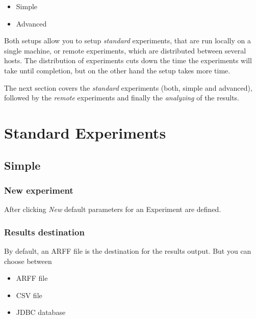 \documentclass[a4paper]{article}
\begin{document}
\begin{itemize}
	\item Simple
	\item Advanced 
\end{itemize}

Both setups allow you to setup \textit{standard} experiments, that are run locally on a single machine, or remote experiments, which are distributed between several hosts. The distribution of experiments cuts down the time the experiments will take until completion, but on the other hand the setup takes more time.

The next section covers the \textit{standard} experiments (both, simple and advanced), followed by the \textit{remote} experiments and finally the \textit{analyzing} of the results.


\newpage
\section{Standard Experiments}


\subsection{Simple}

\subsubsection{New experiment}

After clicking \textit{New} default parameters for an Experiment are defined.

\begin{center}
\end{center}


\subsubsection{Results destination}

By default, an ARFF file is the destination for the results output. But you can choose between

\begin{itemize}
	\item ARFF file
   \item CSV file
   \item JDBC database 
\end{itemize}
\end{document}
